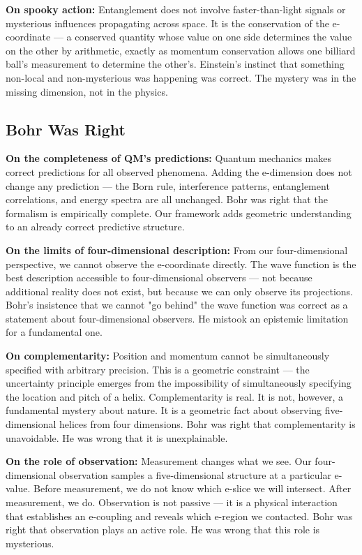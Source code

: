 \documentclass[aps,prd,preprint,superscriptaddress,longbibliography,floatfix]{revtex4-2}
\theoremstyle{remark}
\begin{document}
\textbf{On spooky action:} Entanglement does not involve faster-than-light signals or mysterious influences propagating across space. It is the conservation of the e-coordinate --- a conserved quantity whose value on one side determines the value on the other by arithmetic, exactly as momentum conservation allows one billiard ball's measurement to determine the other's. Einstein's instinct that something non-local and non-mysterious was happening was correct. The mystery was in the missing dimension, not in the physics.



\subsection{Bohr Was Right}

\textbf{On the completeness of QM's predictions:} Quantum mechanics makes correct predictions for all observed phenomena. Adding the e-dimension does not change any prediction --- the Born rule, interference patterns, entanglement correlations, and energy spectra are all unchanged. Bohr was right that the formalism is empirically complete. Our framework adds geometric understanding to an already correct predictive structure.

\textbf{On the limits of four-dimensional description:} From our four-dimensional perspective, we cannot observe the e-coordinate directly. The wave function is the best description accessible to four-dimensional observers --- not because additional reality does not exist, but because we can only observe its projections. Bohr's insistence that we cannot "go behind" the wave function was correct as a statement about four-dimensional observers. He mistook an epistemic limitation for a fundamental one.

\textbf{On complementarity:} Position and momentum cannot be simultaneously specified with arbitrary precision. This is a geometric constraint --- the uncertainty principle emerges from the impossibility of simultaneously specifying the location and pitch of a helix. Complementarity is real. It is not, however, a fundamental mystery about nature. It is a geometric fact about observing five-dimensional helices from four dimensions. Bohr was right that complementarity is unavoidable. He was wrong that it is unexplainable.

\textbf{On the role of observation:} Measurement changes what we see. Our four-dimensional observation samples a five-dimensional structure at a particular e-value. Before measurement, we do not know which e-slice we will intersect. After measurement, we do. Observation is not passive --- it is a physical interaction that establishes an e-coupling and reveals which e-region we contacted. Bohr was right that observation plays an active role. He was wrong that this role is mysterious.
\end{document}
